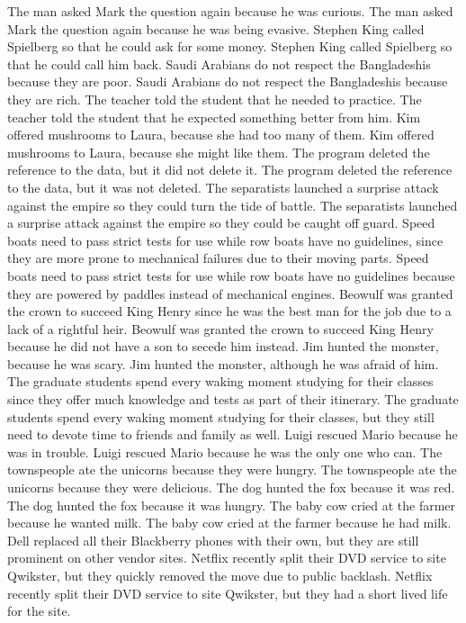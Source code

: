 \documentclass{article}
\begin{document}
\begin{enumerate}
The man asked Mark the question again because he was curious.
The man asked Mark the question again because he was being evasive.
Stephen King called Spielberg so that he could ask for some money.
Stephen King called Spielberg so that he could call him back.
Saudi Arabians do not respect the Bangladeshis because they are poor.
Saudi Arabians do not respect the Bangladeshis because they are rich.
The teacher told the student that he needed to practice.
The teacher told the student that he expected something better from him.
Kim offered mushrooms to Laura, because she had too many of them.
Kim offered mushrooms to Laura, because she might like them.
The program deleted the reference to the data, but it did not delete it.
The program deleted the reference to the data, but it was not deleted.
The separatists launched a surprise attack against the empire so they could turn the tide of battle.
The separatists launched a surprise attack against the empire so they could be caught off guard.
Speed boats need to pass strict tests for use while row boats have no guidelines, since they are more prone to mechanical failures due to their moving parts.
Speed boats need to pass strict tests for use while row boats have no guidelines because they are powered by paddles instead of mechanical engines.
Beowulf was granted the crown to succeed King Henry since he was the best man for the job due to a lack of a rightful heir.
Beowulf was granted the crown to succeed King Henry because he did not have a son to secede him instead.
Jim hunted the monster, because he was scary.
Jim hunted the monster, although he was afraid of him.
The graduate students spend every waking moment studying for their classes since they offer much knowledge and tests as part of their itinerary.
The graduate students spend every waking moment studying for their classes, but they still need to devote time to friends and family as well.
Luigi rescued Mario because he was in trouble.
Luigi rescued Mario because he was the only one who can.
The townspeople ate the unicorns because they were hungry.
The townspeople ate the unicorns because they were delicious.
The dog hunted the fox because it was red.
The dog hunted the fox because it was hungry.
The baby cow cried at the farmer because he wanted milk.
The baby cow cried at the farmer because he had milk.
Dell replaced all their Blackberry phones with their own, but they are still prominent on other vendor sites.
Netflix recently split their DVD service to site Qwikster, but they quickly removed the move due to public backlash.
Netflix recently split their DVD service to site Qwikster, but they had a short lived life for the site.

\end{enumerate}
\end{document}
